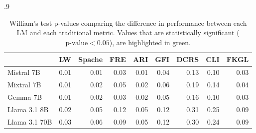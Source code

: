 \begin{table}[!htb]
    \begin{subtable}[t]{.9\textwidth}
        \centering \footnotesize
          \begin{tabular}{l|rrrrrrrr}
         & \multicolumn{1}{l}{LW} & \multicolumn{1}{l}{Spache} & \multicolumn{1}{l}{FRE} & \multicolumn{1}{l}{ARI} & \multicolumn{1}{l}{GFI} & \multicolumn{1}{l}{DCRS} & \multicolumn{1}{l}{CLI} & \multicolumn{1}{l}{FKGL} \\ \hline
        Mistral 7B & \cellcolor[HTML]{B7E1CD}0.01 & \cellcolor[HTML]{B7E1CD}0.01 & \cellcolor[HTML]{B7E1CD}0.03 & \cellcolor[HTML]{B7E1CD}0.01 & \cellcolor[HTML]{B7E1CD}0.04 & 0.13 & 0.10 & \cellcolor[HTML]{B7E1CD}0.03 \\
        Mixtral 7B & \cellcolor[HTML]{B7E1CD}0.01 & \cellcolor[HTML]{B7E1CD}0.02 & \cellcolor[HTML]{B7E1CD}0.05 & \cellcolor[HTML]{B7E1CD}0.02 & 0.06 & 0.19 & 0.14 & \cellcolor[HTML]{B7E1CD}0.04 \\
        Gemma 7B & \cellcolor[HTML]{B7E1CD}0.01 & \cellcolor[HTML]{B7E1CD}0.02 & \cellcolor[HTML]{B7E1CD}0.03 & \cellcolor[HTML]{B7E1CD}0.02 & \cellcolor[HTML]{B7E1CD}0.05 & 0.16 & 0.10 & \cellcolor[HTML]{B7E1CD}0.03 \\
        Llama 3.1 8B & \cellcolor[HTML]{B7E1CD}0.02 & 0.05 & 0.12 & \cellcolor[HTML]{B7E1CD}0.05 & 0.12 & 0.31 & 0.25 & 0.09 \\
        Llama 3.1 70B & \cellcolor[HTML]{B7E1CD}0.03 & 0.06 & 0.09 & \cellcolor[HTML]{B7E1CD}0.05 & 0.12 & 0.30 & 0.24 & 0.09 \\
        \end{tabular}
        \caption{Kendall-Tau p-values.}\label{subtab:kt-pval}
    \end{subtable} 
    \caption{William's test p-values comparing the difference in performance between each LM and each traditional metric. Values that are statistically significant ($\textrm{p-value} < 0.05$), are highlighted in green.}
    \label{tab:signigicance-testing}
\end{table}